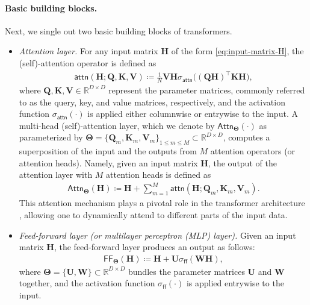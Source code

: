 \documentclass[english]{article}
\newcommand{\Att}{\mathsf{Attn}}
\newcommand{\att}{\mathsf{attn}}
\newcommand{\ff}{\mathsf{ff}}
\newcommand{\MLP}{\mathsf{FF}}
\newcommand{\mlp}{\mathsf{ff}}
\begin{document}
\paragraph{Basic building blocks.} 
Next, we single out two basic building blocks of transformers. 
%
\begin{itemize}
    \item {\em Attention layer.} For any input matrix $\bm{H}$ of the form \eqref{eq:input-matrix-H}, the (self)-attention operator is defined as
    \begin{align}
    \att(\bm{H}; \bm{Q}, \bm{K}, \bm{V}) \coloneqq \frac{1}{N}\bm{V}\bm{H}\sigma_{\att}\big((\bm{Q}\bm{H})^{\top}\bm{K}\bm{H} \big),
    \end{align}
    where $\bm{Q},\bm{K},\bm{V}\in \mathbb{R}^{D\times D}$ represent the parameter matrices, commonly referred to as the query, key, and value matrices, respectively, and the activation function  $\sigma_{\att}(\cdot)$ is applied either columnwise or entrywise to the input.  
    A multi-head (self)-attention layer, which we denote by $\Att_{\bm{\Theta}}(\cdot)$ 
    as parameterized by $\bm{\Theta}=\{\bm{Q}_m, \bm{K}_m, \bm{V}_m\}_{1\leq m\leq M} \subset \mathbb{R}^{D\times D}$,  computes a superposition of the input and the outputs from $M$ attention operators (or attention heads). Namely, given an input matrix $\bm{H}$, the output of the attention layer with $M$ attention heads is defined as
    \begin{align}
        \Att_{\bm{\Theta}}(\bm{H}) \coloneqq 
        \bm{H} + \sum_{m = 1}^M \att(\bm{H}; \bm{Q}_m, \bm{K}_m, \bm{V}_m).
    \end{align}
    This attention mechanism plays a pivotal role in the transformer architecture \citep{vaswani2017attention}, allowing one to dynamically attend to different parts of the input data. 
    
    \item {\em Feed-forward layer (or multilayer perceptron (MLP) layer).} Given an input matrix $\bm{H}$, the feed-forward layer produces an output as follows:
    \begin{align}
        \label{eq:defn-FF-MLP-layer}
        \MLP_{\bm{\Theta}}(\bm{H} ) \coloneqq \bm{H} + \bm{U}\sigma_{\ff}(\bm{W}\bm{H}),
    \end{align}
    where $\bm{\Theta}=\{\bm{U},\bm{W}\}\subset \mathbb{R}^{D\times D}$ 
    bundles the parameter matrices 
    $\bm{U}$ and $\bm{W}$ together, and the activation function $\sigma_{\mlp}(\cdot)$ is applied entrywise to the input. 
    
\end{itemize}
\end{document}
